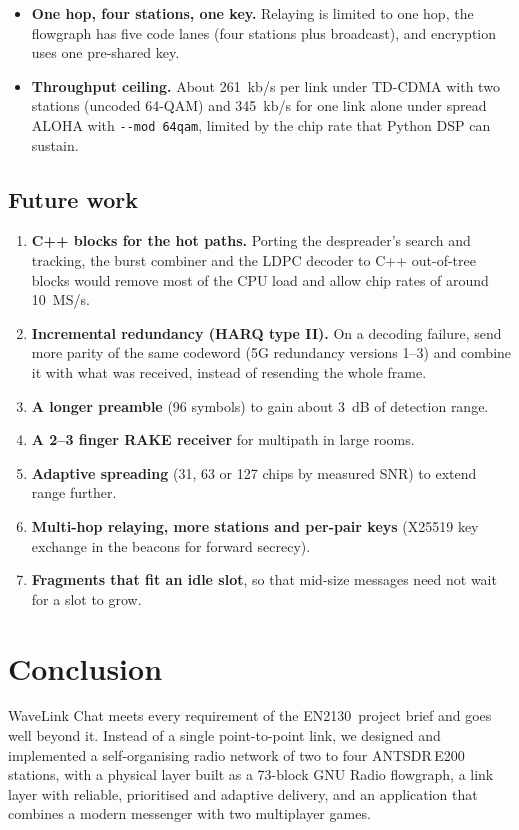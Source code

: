 \documentclass[11pt,a4paper,oneside]{report}
\newcommand{\CourseCode}{EN2130}
\newcommand{\code}[1]{\texttt{\small #1}}
\begin{document}
\begin{itemize}
        2--\SI{5}{s} late for a similar reason: the relay's slot grows only after the sender's.
  \item \textbf{One hop, four stations, one key.} Relaying is limited to one hop, the flowgraph has five
        code lanes (four stations plus broadcast), and encryption uses one pre-shared key.
  \item \textbf{Throughput ceiling.} About \SI{261}{kb/s} per link under TD-CDMA with two stations
        (uncoded 64-QAM) and \SI{345}{kb/s} for one link alone under spread ALOHA with \code{-{}-mod 64qam},
        limited by the chip rate that Python DSP can sustain.
\end{itemize}

\section{Future work}
\begin{enumerate}
  \item \textbf{C++ blocks for the hot paths.} Porting the despreader's search and tracking, the burst
        combiner and the LDPC decoder to C++ out-of-tree blocks would remove most of the CPU load and
        allow chip rates of around \SI{10}{MS/s}.
  \item \textbf{Incremental redundancy (HARQ type II).} On a decoding failure, send more parity of the same
        codeword (5G redundancy versions 1--3) and combine it with what was received, instead of resending
        the whole frame.
  \item \textbf{A longer preamble} (96 symbols) to gain about \SI{3}{dB} of detection range.
  \item \textbf{A 2--3 finger RAKE receiver} for multipath in large rooms.
  \item \textbf{Adaptive spreading} (31, 63 or 127 chips by measured SNR) to extend range further.
  \item \textbf{Multi-hop relaying, more stations and per-pair keys} (X25519 key exchange in the
        beacons for forward secrecy).
  \item \textbf{Fragments that fit an idle slot}, so that mid-size messages need not wait for a slot to grow.
\end{enumerate}

\chapter{Conclusion}\label{ch:conclusion}
WaveLink Chat meets every requirement of the \CourseCode\ project brief and goes well beyond it. Instead of
a single point-to-point link, we designed and implemented a self-organising radio network of two to
four ANTSDR\,E200 stations, with a physical layer built as a 73-block GNU Radio flowgraph, a link layer
with reliable, prioritised and adaptive delivery, and an application that combines a modern messenger
with two multiplayer games.
\end{document}

